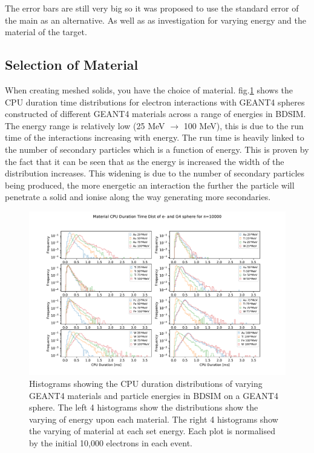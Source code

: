 \documentclass[12pt,a4paper]{article}
\begin{document}
\noindent The error bars are still very big so it was proposed to use the standard error of the main as an alternative. 
As well as as investigation for varying energy and the material of the target.

\subsection{Selection of Material}
When creating meshed solids, you have the choice of material. fig.\ref{novar} shows the CPU duration time distributions for electron interactions with GEANT4 spheres constructed of different GEANT4 materials across a range of energies in BDSIM. The energy range is relatively low (25 MeV $\rightarrow$ 100 MeV), this is due to the run time of the interactions increasing with energy. The run time is heavily linked to the number of secondary particles which is a function of energy. This is proven by the fact that it can be seen that as the energy is increased the width of the distribution increases. This widening is due to the number of secondary particles being produced, the more energetic an interaction the further the particle will penetrate a solid and ionise along the way generating more secondaries.

\begin{figure}[h!]
\centering
\includegraphics[scale=0.6]{Images//Materials//not_Varied_by_radius_and_secondaries.pdf}
\caption[width=\columnwidth]{Histograms showing the CPU duration distributions of varying GEANT4 materials and particle energies in BDSIM on a GEANT4 sphere. The left 4 histograms show the distributions show the varying of energy upon each material. The right 4 histograms show the varying of material at each set energy. Each plot is normalised by the initial 10,000 electrons in each event.}
\label{novar}
\end{figure}
\end{document}
